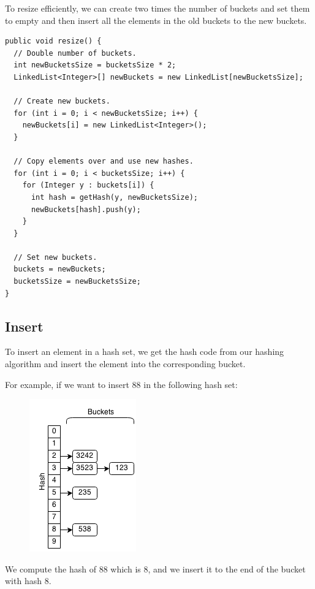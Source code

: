 \documentclass[11pt,oneside]{book}
\makeatletter
\def\maxwidth#1{\ifdim\Gin@nat@width>#1 #1\else\Gin@nat@width\fi}
\makeatother
\begin{document}
To resize efficiently, we can create two times the number of buckets and set them to empty and then insert all the elements in the old buckets to the new buckets.

\begin{lstlisting}
public void resize() {
  // Double number of buckets.
  int newBucketsSize = bucketsSize * 2;
  LinkedList<Integer>[] newBuckets = new LinkedList[newBucketsSize];
  
  // Create new buckets.
  for (int i = 0; i < newBucketsSize; i++) {
    newBuckets[i] = new LinkedList<Integer>();
  }
  
  // Copy elements over and use new hashes.
  for (int i = 0; i < bucketsSize; i++) {
    for (Integer y : buckets[i]) {
      int hash = getHash(y, newBucketsSize);
      newBuckets[hash].push(y);
    }
  }
  
  // Set new buckets.
  buckets = newBuckets;
  bucketsSize = newBucketsSize;
}
\end{lstlisting}

\subsection{Insert}

To insert an element in a hash set, we get the hash code from our hashing algorithm and insert the element into the corresponding bucket.

For example, if we want to insert 88 in the following hash set:

\vspace{5px}\begin{figure}[H]\centering
        \includegraphics[width=0.66\maxwidth{\textwidth}]{hashset.png}
        \end{figure}

We compute the hash of 88 which is 8, and we insert it to the end of the bucket with hash 8.
\end{document}
